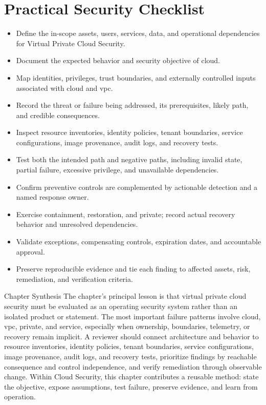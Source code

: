 \documentclass[11pt,letterpaper]{article}
\begin{document}
\section*{Practical Security Checklist}
\begin{itemize}[label=$\square$]
\item Define the in-scope assets, users, services, data, and operational dependencies for Virtual Private Cloud Security.
\item Document the expected behavior and security objective of cloud.
\item Map identities, privileges, trust boundaries, and externally controlled inputs associated with cloud and vpc.
\item Record the threat or failure being addressed, its prerequisites, likely path, and credible consequences.
\item Inspect resource inventories, identity policies, tenant boundaries, service configurations, image provenance, audit logs, and recovery tests.
\item Test both the intended path and negative paths, including invalid state, partial failure, excessive privilege, and unavailable dependencies.
\item Confirm preventive controls are complemented by actionable detection and a named response owner.
\item Exercise containment, restoration, and private; record actual recovery behavior and unresolved dependencies.
\item Validate exceptions, compensating controls, expiration dates, and accountable approval.
\item Preserve reproducible evidence and tie each finding to affected assets, risk, remediation, and verification criteria.
\end{itemize}
\begin{CornellSummaryBox}{Chapter Synthesis}
The chapter's principal lesson is that virtual private cloud security must be evaluated as an operating security system rather than an isolated product or statement. The most important failure patterns involve cloud, vpc, private, and service, especially when ownership, boundaries, telemetry, or recovery remain implicit. A reviewer should connect architecture and behavior to resource inventories, identity policies, tenant boundaries, service configurations, image provenance, audit logs, and recovery tests, prioritize findings by reachable consequence and control independence, and verify remediation through observable change. Within Cloud Security, this chapter contributes a reusable method: state the objective, expose assumptions, test failure, preserve evidence, and learn from operation.
\end{CornellSummaryBox}
\end{document}
